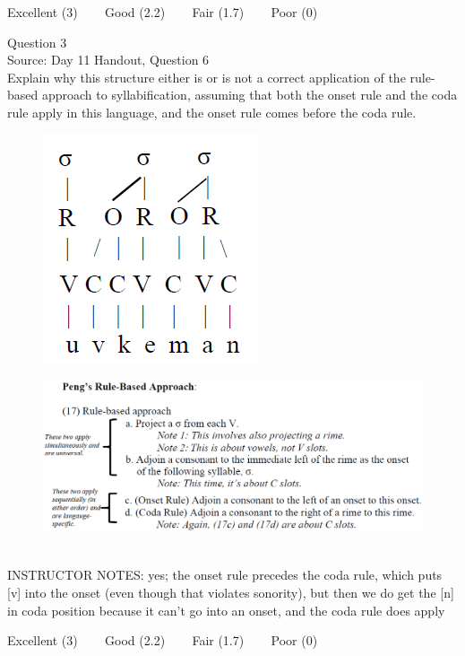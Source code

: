 \documentclass[12pt]{article}
\begin{document}
\vfill
Excellent (3) ~~~ Good (2.2) ~~~ Fair (1.7) ~~~ Poor (0)
\newpage

{\large Question 3}\\

Source: Day 11 Handout, Question 6\\

Explain why this structure either is or is not a correct application of the rule-based approach to syllabification, assuming that both the onset rule and the coda rule apply in this language, and the onset rule comes before the coda rule.\\

\begin{figure}[H]
\includegraphics{../images/pengrules_uvkeman_yes.png}
\end{figure}
\begin{figure}[H]
\includegraphics{../images/peng_rules.png}
\end{figure}

~\\
INSTRUCTOR NOTES: yes; the onset rule precedes the coda rule, which puts [v] into the onset (even though that violates sonority), but then we do get the [n] in coda position because it can't go into an onset, and the coda rule does apply


\vfill
Excellent (3) ~~~ Good (2.2) ~~~ Fair (1.7) ~~~ Poor (0)
\newpage
\end{document}
